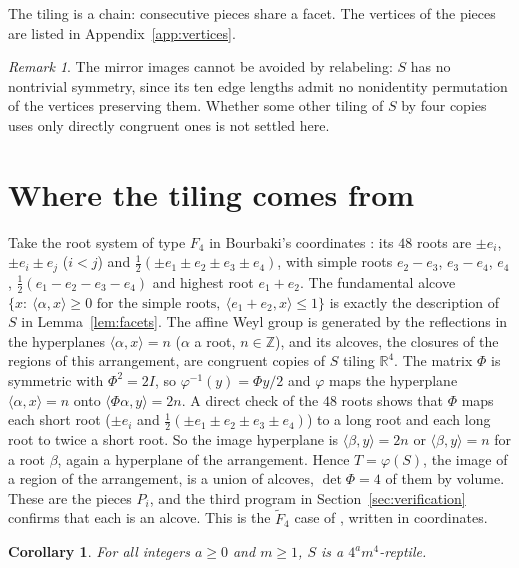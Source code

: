 \documentclass[11pt]{article}
\newtheorem{corollary}[theorem]{Corollary}
\theoremstyle{remark}
\newtheorem{remark}[theorem]{Remark}
\begin{document}
The tiling is a chain: consecutive pieces share a facet. The vertices
of the pieces are listed in Appendix~\ref{app:vertices}.

\begin{remark}\label{rem:chiral}
The mirror images cannot be avoided by relabeling: $S$ has no
nontrivial symmetry, since its ten edge lengths admit no nonidentity
permutation of the vertices preserving them. Whether some other tiling
of $S$ by four copies uses only directly congruent ones is not settled
here.
\end{remark}

\section{Where the tiling comes from}\label{sec:origin}

Take the root system of type $F_4$ in Bourbaki's coordinates
\cite[Plate~VIII]{Bou}: its $48$ roots are $\pm e_i$, $\pm e_i\pm e_j$
($i<j$) and $\frac12(\pm e_1\pm e_2\pm e_3\pm e_4)$, with simple roots
$e_2-e_3$, $e_3-e_4$, $e_4$, $\frac12(e_1-e_2-e_3-e_4)$ and highest root
$e_1+e_2$. The fundamental alcove $\{x:\ \langle\alpha,x\rangle\ge0
\text{ for the simple roots},\ \langle e_1+e_2,x\rangle\le1\}$ is exactly
the description of $S$ in Lemma~\ref{lem:facets}. The affine Weyl group
is generated by the reflections in the hyperplanes $\langle\alpha,x\rangle
=n$ ($\alpha$ a root, $n\in\mathbb{Z}$), and its alcoves, the closures of
the regions of this arrangement, are congruent copies of $S$ tiling
$\mathbb{R}^4$. The matrix $\Phi$ is symmetric with $\Phi^2=2I$, so
$\varphi^{-1}(y)=\Phi y/2$ and $\varphi$ maps the hyperplane
$\langle\alpha,x\rangle=n$ onto $\langle\Phi\alpha,y\rangle=2n$. A direct
check of the $48$ roots shows that $\Phi$ maps each short root
($\pm e_i$ and $\frac12(\pm e_1\pm e_2\pm e_3\pm e_4)$) to a long root and
each long root to twice a short root. So the image hyperplane is
$\langle\beta,y\rangle=2n$ or $\langle\beta,y\rangle=n$ for a root $\beta$,
again a hyperplane of the arrangement. Hence $T=\varphi(S)$, the image of
a region of the arrangement, is a union of alcoves, $\det\Phi=4$ of them
by volume. These are the pieces $P_i$, and the third program in
Section~\ref{sec:verification} confirms that each is an alcove. This is
the $\widetilde F_4$ case of \cite[Lemma~10]{FT}, written in coordinates.

\begin{corollary}\label{cor:powers}
For all integers $a\ge0$ and $m\ge1$, $S$ is a $4^am^4$-reptile.
\end{corollary}
\end{document}

